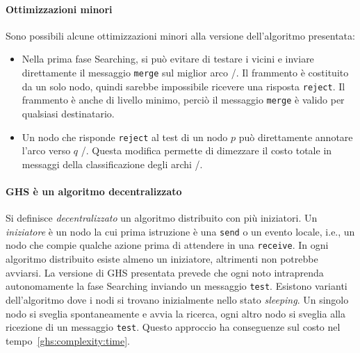 \documentclass[target=bach,aauheader=,style=]{thud}
\newcommand{\eng}[1]{\foreignlanguage{english}{#1}}
\begin{document}
\paragraph{Ottimizzazioni minori}
Sono possibili alcune ottimizzazioni minori alla versione dell'algoritmo presentata:
\begin{itemize}
    \item Nella prima fase \eng{Searching}, si può evitare di testare i vicini e inviare direttamente il messaggio \lstinline{merge} sul miglior arco \undecided/. Il frammento è costituito da un solo nodo, quindi sarebbe impossibile ricevere una risposta \lstinline{reject}. Il frammento è anche di livello minimo, perciò il messaggio \lstinline{merge} è valido per qualsiasi destinatario.
    \item Un nodo che risponde \lstinline{reject} al test di un nodo $p$ può direttamente annotare l'arco verso $q$ \rejected/. Questa modifica permette di dimezzare il costo totale in messaggi della classificazione degli archi \rejected/.
\end{itemize}

\paragraph{GHS è un algoritmo decentralizzato}
Si definisce \emph{decentralizzato} un algoritmo distribuito con più iniziatori. Un \emph{iniziatore} è un nodo la cui prima istruzione è una \lstinline{send} o un evento locale, i.e., un nodo che compie qualche azione prima di attendere in una \lstinline{receive}. In ogni algoritmo distribuito esiste almeno un iniziatore, altrimenti non potrebbe avviarsi. La versione di GHS presentata prevede che ogni noto intraprenda autonomamente la fase \eng{Searching} inviando un messaggio \lstinline{test}. Esistono varianti dell'algoritmo dove i nodi si trovano inizialmente nello stato \emph{\eng{sleeping}}. Un singolo nodo si sveglia spontaneamente e avvia la ricerca, ogni altro nodo si sveglia alla ricezione di un messaggio \lstinline{test}. Questo approccio ha conseguenze sul costo nel tempo~\ref{ghs:complexity:time}.
\end{document}
